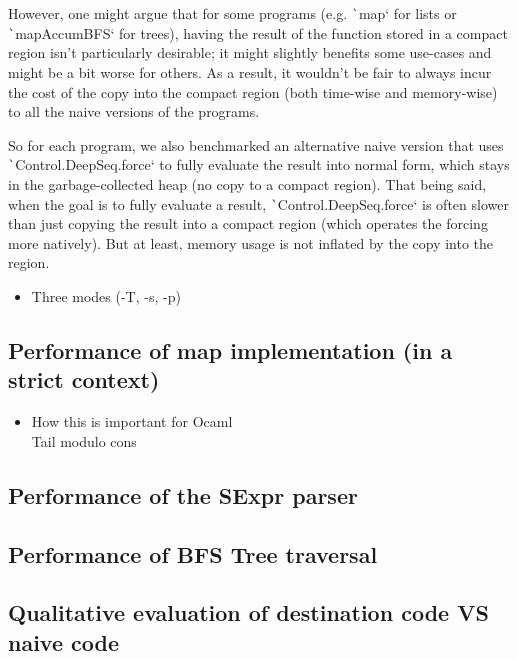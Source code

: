 \documentclass[english]{jflart}
\newcommand{\TODO}[1]{{\color{red}\large #1}}
\begin{document}
However, one might argue that for some programs (e.g. \texttt`map` for lists or \texttt`mapAccumBFS` for trees), having the result of the function stored in a compact region isn't particularly desirable; it might slightly benefits some use-cases and might be a bit worse for others. As a result, it wouldn't be fair to always incur the cost of the copy into the compact region (both time-wise and memory-wise) to all the naive versions of the programs.

So for each program, we also benchmarked an alternative naive version that uses \texttt`Control.DeepSeq.force` to fully evaluate the result into normal form, which stays in the garbage-collected heap (no copy to a compact region). That being said, when the goal is to fully evaluate a result, \texttt`Control.DeepSeq.force` is often slower than just copying the result into a compact region (which operates the forcing more natively). But at least, memory usage is not inflated by the copy into the region.

\begin{itemize}
\item Three modes (-T, -s, -p)
\end{itemize}

\subsection{Performance of map implementation (in a strict context)}

\begin{itemize}
\item How this is important for Ocaml \\\TODO{Tail modulo cons}
\end{itemize}


\subsection{Performance of the SExpr parser}

\subsection{Performance of BFS Tree traversal}\label{ssec:benchmark-parser}

\subsection{Qualitative evaluation of destination code VS naive code}
\end{document}
